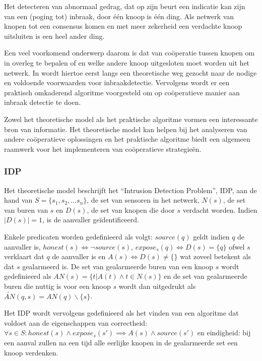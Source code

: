 Het detecteren van abnormaal gedrag, dat op zijn beurt een indicatie kan zijn
van een (poging tot) inbraak, door \'e\'en knoop is \'e\'en ding. Als netwerk
van knopen tot een consensus komen en met meer zekerheid een verdachte knoop
uitsluiten is een heel ander ding.

Een veel voorkomend onderwerp daarom is dat van co\"operatie tussen knopen om
in overleg te bepalen of en welke andere knoop uitgesloten moet worden uit het
netwerk. In \cite{krontiris2009cooperative} wordt hiertoe eerst langs een
theoretische weg gezocht naar de nodige en voldoende voorwaarden voor
inbraakdetectie. Vervolgens wordt er een praktisch omkaderend algoritme
voorgesteld om op co\"operatieve manier aan inbraak detectie te doen.

Zowel het theoretische model als het praktische algoritme vormen een
interessante bron van informatie. Het theoretische model kan helpen bij het
analyseren van andere co\"operatieve oplossingen en het praktische algoritme
biedt een algemeen raamwerk voor het implementeren van co\"operatieve
strategie\"en.

\subsubsection*{IDP}

Het theoretische model beschrijft het ``Intrusion Detection Problem'', IDP, aan
de hand van $S = \{ s_1, s_2, \dots s_n \}$, de set van sensoren in het netwerk,
$N(s)$, de set van buren van $s$ en $D(s)$, de set van knopen die door $s$
verdacht worden. Indien $|D(s)| = 1$, is de aanvaller ge\"identificeerd.

Enkele predicaten worden gedefinieerd als volgt: $source(q)$ geldt indien $q$
de aanvaller is, $honest(s) \iff \neg source(s)$, $expose_s(q) \iff D(s) = \{ q
\}$ ofwel $s$ verklaart dat $q$ de aanvaller is en $A(s) \iff D(s) \not= \{\}$
wat zoveel betekent als dat $s$ gealarmeerd is. De set van gealarmeerde buren
van een knoop $s$ wordt gedefinieerd als $AN(s) = \{ t | A(t) \wedge t \in N(s)
\}$ en de set van gealarmeerde buren die nuttig is voor een knoop $s$ wordt dan
uitgedrukt als $\tilde{AN}(q,s) = AN(q) \backslash \{s\}$.

Het IDP wordt vervolgens gedefinieerd als het vinden van een algoritme dat
voldoet aan de eigenschappen van correctheid: $\forall s \in S : honest(s)
\wedge expose_s(s') \implies A(s) \wedge source(s')$ en eindigheid: bij een
aanval zullen na een tijd alle eerlijke knopen in de gealarmeerde set een knoop
verdenken.

